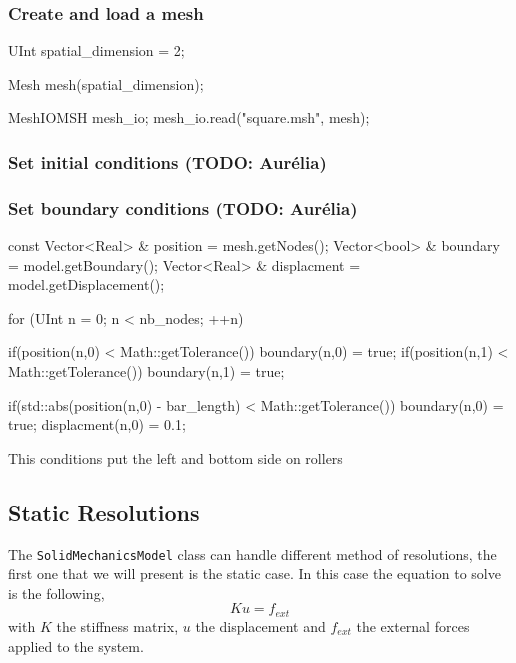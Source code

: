 \documentclass[a4paper,11pt]{book}
\newcommand{\code}[1]{{\tt{#1}}}
\newcommand{\todo}[1]{({\small\color{red}\textbf{TODO: }\textbf{#1}})}
\begin{document}
\subsubsection{Create and load a mesh\label{sect:common:mesh}}


\begin{cpp}
  UInt spatial_dimension = 2;

  Mesh mesh(spatial_dimension);

  MeshIOMSH mesh_io;
  mesh_io.read("square.msh", mesh);
\end{cpp}

\subsubsection{Set initial conditions \todo{Aur\'elia}}
\subsubsection{Set boundary conditions\label{sect:smm:boundary} \todo{Aur\'elia}}

\begin{cpp}
  const  Vector<Real> & position = mesh.getNodes();
  Vector<bool> & boundary = model.getBoundary();
  Vector<Real> & displacment = model.getDisplacement();

  for (UInt n = 0; n < nb_nodes; ++n) {
    if(position(n,0) < Math::getTolerance()) boundary(n,0) = true;
    if(position(n,1) < Math::getTolerance()) boundary(n,1) = true;

    if(std::abs(position(n,0) - bar_length) < Math::getTolerance()) {
      boundary(n,0) = true;
      displacment(n,0) = 0.1;
    }
  }
\end{cpp}

This conditions put the left and bottom side on rollers

\subsection{Static Resolutions\label{sect:smm:static}}

The \code{SolidMechanicsModel} class can handle different method of resolutions,
the first one that we will present is the static case. In this case the equation
to solve is the following,
\begin{equation}\label{eqn:smm:static}
  K u = f_{ext}
\end{equation}
with $K$ the  stiffness matrix, $u$ the displacement  and $f_{ext}$ the external
forces applied to the system.
\end{document}
